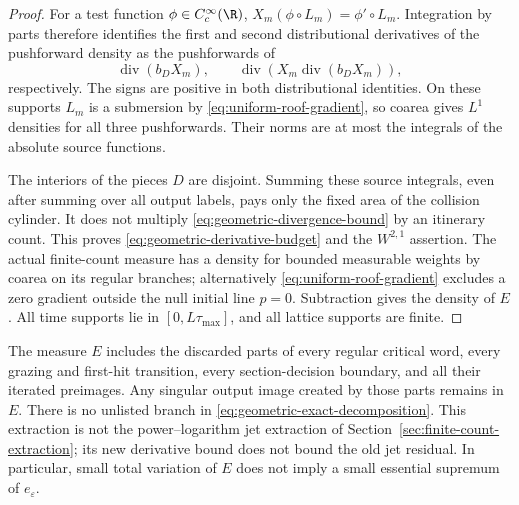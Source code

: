 \begin{proof}
For a test function $\phi\in C_c^\infty(\R)$,
$X_m(\phi\circ L_m)=\phi'\circ L_m$. Integration by parts therefore
identifies the first and second distributional derivatives of the
pushforward density as the pushforwards of
\begin{equation}\label{eq:geometric-density-derivatives}
 \operatorname{div}(b_DX_m),\qquad
 \operatorname{div}(X_m\operatorname{div}(b_DX_m)),
\end{equation}
respectively. The signs are positive in both distributional identities.
On these supports $L_m$ is a submersion by
\eqref{eq:uniform-roof-gradient}, so coarea gives $L^1$ densities for
all three pushforwards. Their norms are at most the integrals of the
absolute source functions.

The interiors of the pieces $D$ are disjoint. Summing these source
integrals, even after summing over all output labels, pays only the
fixed area of the collision cylinder. It does not multiply
\eqref{eq:geometric-divergence-bound} by an itinerary count. This proves
\eqref{eq:geometric-derivative-budget} and the $W^{2,1}$ assertion.
The actual finite-count measure has a density for bounded measurable
weights by coarea on its regular branches; alternatively
\eqref{eq:uniform-roof-gradient} excludes a zero gradient outside the
null initial line $p=0$. Subtraction gives the density of $E$.
All time supports lie in $[0,L\tau_{\max}]$, and all lattice supports
are finite.
\end{proof}

\begin{remark}\label{rem:geometric-extraction-scope}
The measure $E$ includes the discarded parts of every regular critical
word, every grazing and first-hit transition, every section-decision
boundary, and all their iterated preimages. Any singular output image
created by those parts remains in $E$. There is no unlisted branch in
\eqref{eq:geometric-exact-decomposition}. This extraction is not the
power--logarithm jet extraction of Section~\ref{sec:finite-count-extraction};
its new derivative bound does not bound the old jet residual. In
particular, small total variation of $E$ does not imply a small
essential supremum of $e_\varepsilon$.
\end{remark}
